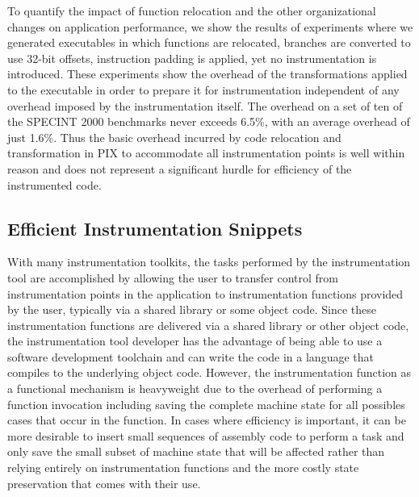 To quantify the impact of function relocation and the other organizational changes
on application performance, we show the results of experiments
where we generated executables in which functions are relocated, branches are converted to use 32-bit offsets, 
instruction padding is applied, yet no instrumentation is introduced. 
These experiments show the overhead of the transformations applied to the executable 
in order to prepare it for instrumentation independent of any overhead imposed by the 
instrumentation itself. The overhead on a set of ten of the 
SPECINT 2000 benchmarks never exceeds 6.5\%, with an average
overhead of just 1.6\%. Thus the basic overhead incurred by code relocation and transformation in PIX to accommodate all instrumentation points is
well within reason and does not represent a significant hurdle for efficiency of the instrumented code.

\subsection{Efficient Instrumentation Snippets}

With many instrumentation toolkits, the tasks performed by the instrumentation tool are accomplished by allowing the user
to transfer control from instrumentation points in the application to instrumentation functions provided by the user, typically
via a shared library or some object code. Since these instrumentation functions are delivered via a shared library or other
object code, the instrumentation tool developer has the advantage of being able to use a software development toolchain and can
write the code in a language that compiles to the underlying object code. However, 
the instrumentation function as a functional mechanism is heavyweight due to 
the overhead of performing a function invocation including saving 
the complete machine state for all possibles cases that occur in the function. In cases where
efficiency is important, it can be more desirable to insert small sequences of assembly code to perform a task and only
save the small subset of machine state that will be affected rather than relying entirely on instrumentation functions and the
more costly state preservation that comes with their use.

